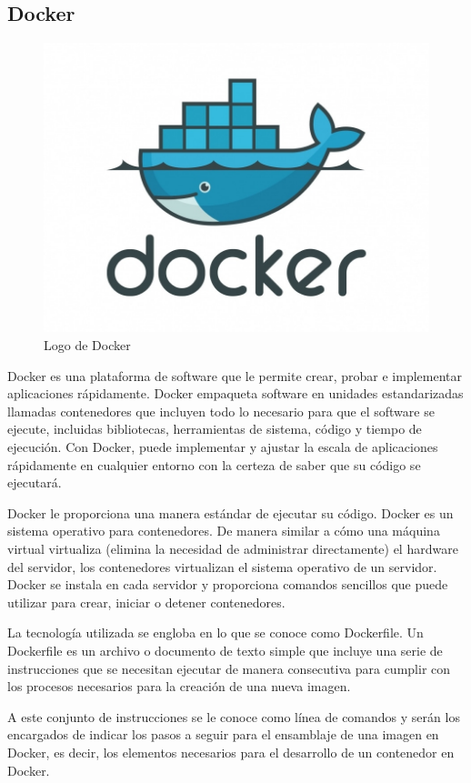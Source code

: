 \newpage
\subsection{Docker}\label{docker}

\begin{figure}[h]
    \centering
    \includegraphics[width=.5\textwidth]{images/logodocker.jpg}
    \caption{Logo de Docker}
    \label{fig:img3}
\end{figure}

Docker es una plataforma de software que le permite crear, probar e implementar aplicaciones rápidamente. Docker empaqueta software en unidades estandarizadas llamadas contenedores que incluyen todo lo necesario para que el software se ejecute, incluidas bibliotecas, herramientas de sistema, código y tiempo de ejecución. Con Docker, puede implementar y ajustar la escala de aplicaciones rápidamente en cualquier entorno con la certeza de saber que su código se ejecutará.

Docker le proporciona una manera estándar de ejecutar su código. Docker es un sistema operativo para contenedores. De manera similar a cómo una máquina virtual virtualiza (elimina la necesidad de administrar directamente) el hardware del servidor, los contenedores virtualizan el sistema operativo de un servidor. Docker se instala en cada servidor y proporciona comandos sencillos que puede utilizar para crear, iniciar o detener contenedores.

La tecnología utilizada se engloba en lo que se conoce como Dockerfile.
Un Dockerfile es un archivo o documento de texto simple que incluye una serie de instrucciones que se necesitan ejecutar de manera consecutiva para cumplir con los procesos necesarios para la creación de una nueva imagen.

A este conjunto de instrucciones se le conoce como línea de comandos y serán los encargados de indicar los pasos a seguir para el ensamblaje de una imagen en Docker, es decir, los elementos necesarios para el desarrollo de un contenedor en Docker.

